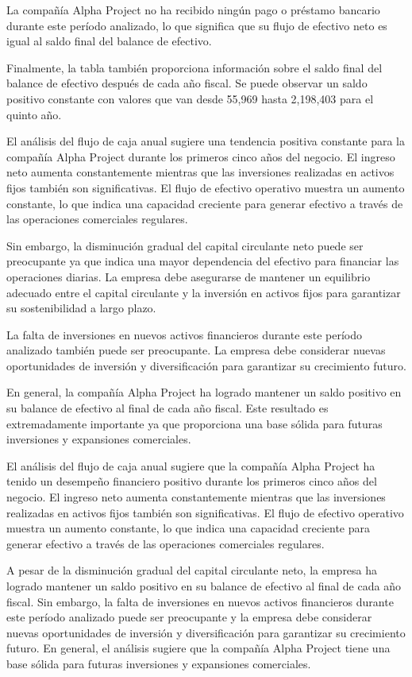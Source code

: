 La compañía Alpha Project no ha recibido ningún pago o préstamo bancario durante este período analizado, lo que significa que su flujo de efectivo neto es igual al saldo final del balance de efectivo.

Finalmente, la tabla también proporciona información sobre el saldo final del balance de efectivo después de cada año fiscal. Se puede observar un saldo positivo constante con valores que van desde 55,969 hasta 2,198,403 para el quinto año.



El análisis del flujo de caja anual sugiere una tendencia positiva constante para la compañía Alpha Project durante los primeros cinco años del negocio. El ingreso neto aumenta constantemente mientras que las inversiones realizadas en activos fijos también son significativas. El flujo de efectivo operativo muestra un aumento constante, lo que indica una capacidad creciente para generar efectivo a través de las operaciones comerciales regulares.

Sin embargo, la disminución gradual del capital circulante neto puede ser preocupante ya que indica una mayor dependencia del efectivo para financiar las operaciones diarias. La empresa debe asegurarse de mantener un equilibrio adecuado entre el capital circulante y la inversión en activos fijos para garantizar su sostenibilidad a largo plazo.

La falta de inversiones en nuevos activos financieros durante este período analizado también puede ser preocupante. La empresa debe considerar nuevas oportunidades de inversión y diversificación para garantizar su crecimiento futuro.

En general, la compañía Alpha Project ha logrado mantener un saldo positivo en su balance de efectivo al final de cada año fiscal. Este resultado es extremadamente importante ya que proporciona una base sólida para futuras inversiones y expansiones comerciales.



El análisis del flujo de caja anual sugiere que la compañía Alpha Project ha tenido un desempeño financiero positivo durante los primeros cinco años del negocio. El ingreso neto aumenta constantemente mientras que las inversiones realizadas en activos fijos también son significativas. El flujo de efectivo operativo muestra un aumento constante, lo que indica una capacidad creciente para generar efectivo a través de las operaciones comerciales regulares.

A pesar de la disminución gradual del capital circulante neto, la empresa ha logrado mantener un saldo positivo en su balance de efectivo al final de cada año fiscal. Sin embargo, la falta de inversiones en nuevos activos financieros durante este período analizado puede ser preocupante y la empresa debe considerar nuevas oportunidades de inversión y diversificación para garantizar su crecimiento futuro. En general, el análisis sugiere que la compañía Alpha Project tiene una base sólida para futuras inversiones y expansiones comerciales.